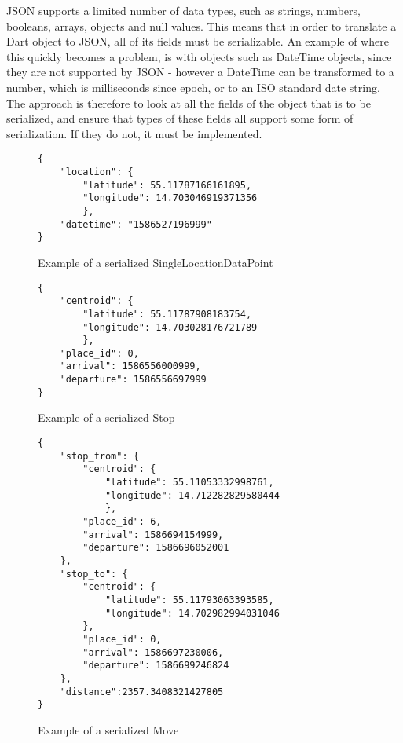 JSON supports a limited number of data types, such as strings, numbers, booleans, arrays, objects and null values. This means that in order to translate a Dart object to JSON, all of its fields must be serializable. An example of where this quickly becomes a problem, is with objects such as DateTime objects, since they are not supported by JSON - however a DateTime can be transformed to a number, which is milliseconds since epoch, or to an ISO standard date string. The approach is therefore to look at all the fields of the object that is to be serialized, and ensure that types of these fields all support some form of serialization. If they do not, it must be implemented.

\begin{figure}
    \centering
\begin{verbatim}
{
    "location": {
        "latitude": 55.11787166161895,
        "longitude": 14.703046919371356
        },
    "datetime": "1586527196999"
}
\end{verbatim}
    \caption{Example of a serialized SingleLocationDataPoint}
    \label{fig:serialized_point}
\end{figure}

\begin{figure}
    \centering
\begin{verbatim}
{
    "centroid": {
        "latitude": 55.11787908183754,
        "longitude": 14.703028176721789
        },
    "place_id": 0,
    "arrival": 1586556000999,
    "departure": 1586556697999
}
\end{verbatim}
    \caption{Example of a serialized Stop}
    \label{fig:serialized_stop}
\end{figure}

\begin{figure}
    \centering
\begin{verbatim}
{
    "stop_from": {
        "centroid": {
            "latitude": 55.11053332998761,
            "longitude": 14.712282829580444
            },
        "place_id": 6,
        "arrival": 1586694154999,
        "departure": 1586696052001
    },
    "stop_to": {
        "centroid": {
            "latitude": 55.11793063393585,
            "longitude": 14.702982994031046
        },
        "place_id": 0,
        "arrival": 1586697230006,
        "departure": 1586699246824
    },
    "distance":2357.3408321427805
}
\end{verbatim}
    \caption{Example of a serialized Move}
    \label{fig:serialized_move}
\end{figure}

